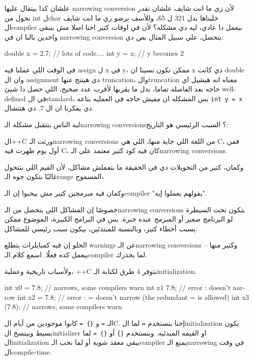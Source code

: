 \documentclass[11pt]{article}
\let\OriginalVerbatim\verbatim
\let\endOriginalVerbatim\endverbatim
\renewenvironment{verbatim}{\begin{english}\OriginalVerbatim}{\endOriginalVerbatim\end{english}}
\begin{document}
علشان كدا بيتقال عليها narrowing conversion لأن زي ما انت شايف علشان نقدر نحول من int لchar خليناها بدل 321 ل 65، وللأسف برضو زي ما انت شايف الcompiler بيعمل دا عادي، ليه دي مشكله؟ لأن في اوقات كتير احنا اصلا مش بنبقي واخدين بالنا ان في narrowing conversion بتحصل، علي سبيل المثال بص دي:

\begin{verbatim}
double x = 2.7;
// lots of code....
int y = x;  // y becomes 2
\end{verbatim}

في الوقت اللي عملنا فيه assign ل x في y، ممكن نكون نسينا ان x دي كانت double وان ال assignment دي هينتج عنها truncation، والtruncation معناه انه هيشيل اي حاجه بعد الفاصله تماما، بدل ما يقربها لأقرب عدد صحيح، اللي حصل دا شيئ well-defined في الstandard، بس المشكله ان مفيش حاجه في العمليه بتاعه \texttt{int y = x} دي يفكرنا ان ال 7. دي هتتشال.

ليه الناس بتتقبل مشكلة الـnarrowing conversions؟ السبب الرئيسي هو التاريخ:

ال++C ورثت الـnarrowing conversions من اللغة اللي جاية منها، اللي هي C، فمن أول يوم ظهرت فيه C، كان فيه كود كتير معتمد على الـnarrowing conversions.

وكمان، كتير من التحويلات دي في الحقيقة ما بتعملش مشاكل، لأن القيم اللي بتتحول غالبًا بتكون جوه الـrange المسموح،

وكمان فيه مبرمجين كتير مش بيحبوا إن الـcompiler "يقولهم يعملوا إيه".

خصوصًا إن المشاكل اللي بتحصل من الـnarrowing conversions بتكون تحت السيطرة لو البرنامج صغير أو المبرمج عنده خبرة. بس في البرامج الكبيرة، الموضوع ممكن يسبب أخطاء كتير، وبالنسبة للمبتدئين، بيكون سبب رئيسي للمشاكل.

الحلو إن فيه كمبايلرات بتطلع warnings عن الـnarrowing conversions – وكتير منها بيعمل كده فعلًا. اسمع كلام الـcompiler لما يحذرك.

ولأسباب تاريخية وعملية، ++C بتوفر 4 طرق لكتابة الـinitialization.

\begin{verbatim}
int x0 = 7.8;    // narrows, some compilers warn
int x1 {7.8};    // error : {} doesn’t narrow
int x2 = {7.8};  // error : ={} doesn’t narrow (the redundant = is allowed)
int x3 (7.8);    // narrows, some compilers warn
\end{verbatim}

الـ \texttt{=} و \texttt{\{\} =} كانوا موجودين من أيام الC.
إحنا بنستخدم \texttt{=} لما الinitialization يكون بسيط وبينسخ الinitializer او القيمه المبدئيه.
وبنستخدم \texttt{\{\}} أو \texttt{\{\} =} لما الinitialization يبقي معقد شوية أو لما نحب الـcompiler يمنع الـnarrowing في وقت الcompile-time.
\end{document}
